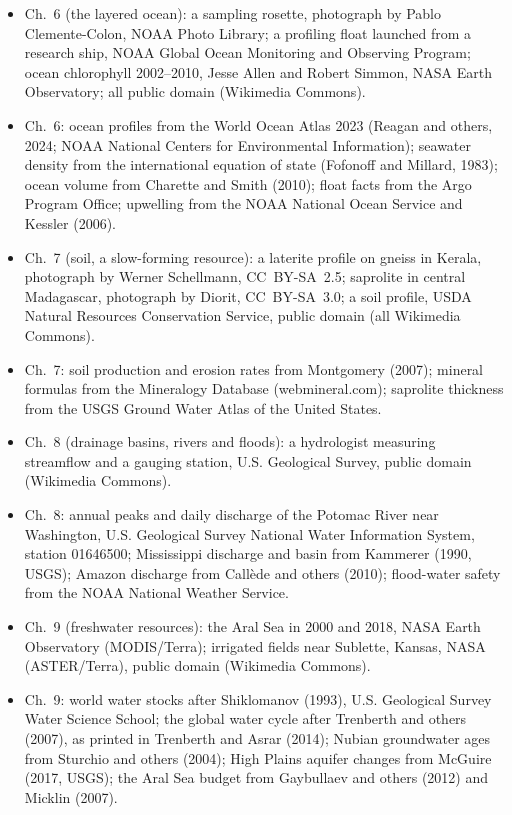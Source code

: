 \begin{itemize}
  \item Ch.~6 (the layered ocean): a sampling rosette, photograph by Pablo Clemente-Colon, NOAA Photo Library; a profiling float launched from a research ship, NOAA Global Ocean Monitoring and Observing Program; ocean chlorophyll 2002--2010, Jesse Allen and Robert Simmon, NASA Earth Observatory; all public domain (Wikimedia Commons).
  \item Ch.~6: ocean profiles from the World Ocean Atlas 2023 (Reagan and others, 2024; NOAA National Centers for Environmental Information); seawater density from the international equation of state (Fofonoff and Millard, 1983); ocean volume from Charette and Smith (2010); float facts from the Argo Program Office; upwelling from the NOAA National Ocean Service and Kessler (2006).
  \item Ch.~7 (soil, a slow-forming resource): a laterite profile on gneiss in Kerala, photograph by Werner Schellmann, CC~BY-SA~2.5; saprolite in central Madagascar, photograph by Diorit, CC~BY-SA~3.0; a soil profile, USDA Natural Resources Conservation Service, public domain (all Wikimedia Commons).
  \item Ch.~7: soil production and erosion rates from Montgomery (2007); mineral formulas from the Mineralogy Database (webmineral.com); saprolite thickness from the USGS Ground Water Atlas of the United States.
  \item Ch.~8 (drainage basins, rivers and floods): a hydrologist measuring streamflow and a gauging station, U.S. Geological Survey, public domain (Wikimedia Commons).
  \item Ch.~8: annual peaks and daily discharge of the Potomac River near Washington, U.S. Geological Survey National Water Information System, station 01646500; Mississippi discharge and basin from Kammerer (1990, USGS); Amazon discharge from Callède and others (2010); flood-water safety from the NOAA National Weather Service.
  \item Ch.~9 (freshwater resources): the Aral Sea in 2000 and 2018, NASA Earth Observatory (MODIS/Terra); irrigated fields near Sublette, Kansas, NASA (ASTER/Terra), public domain (Wikimedia Commons).
  \item Ch.~9: world water stocks after Shiklomanov (1993), U.S. Geological Survey Water Science School; the global water cycle after Trenberth and others (2007), as printed in Trenberth and Asrar (2014); Nubian groundwater ages from Sturchio and others (2004); High Plains aquifer changes from McGuire (2017, USGS); the Aral Sea budget from Gaybullaev and others (2012) and Micklin (2007).

\end{itemize}
